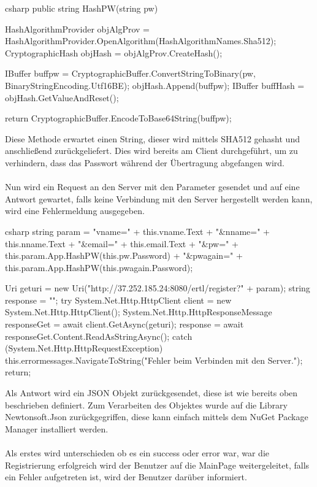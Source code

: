\begin{code}{csharp}
	public string HashPW(string pw)
	{
		HashAlgorithmProvider objAlgProv = HashAlgorithmProvider.OpenAlgorithm(HashAlgorithmNames.Sha512);
		CryptographicHash objHash = objAlgProv.CreateHash();
		
		IBuffer buffpw = CryptographicBuffer.ConvertStringToBinary(pw, BinaryStringEncoding.Utf16BE);
		objHash.Append(buffpw);
		IBuffer buffHash = objHash.GetValueAndReset();
		
		return CryptographicBuffer.EncodeToBase64String(buffpw);
	}
\end{code}

Diese Methode erwartet einen String, dieser wird mittels SHA512 gehasht und anschließend zurückgeliefert. Dies wird bereits am Client durchgeführt, um zu verhindern, dass das Passwort während der Übertragung abgefangen wird.
\\\\
Nun wird ein Request an den Server mit den Parameter gesendet und auf eine Antwort gewartet, falls keine Verbindung mit den Server hergestellt werden kann, wird eine Fehlermeldung ausgegeben.

\begin{code}{csharp}
	string param = "vname=" + this.vname.Text + "&nname=" + this.nname.Text + "&email=" + this.email.Text + "&pw=" + this.param.App.HashPW(this.pw.Password) + "&pwagain=" + this.param.App.HashPW(this.pwagain.Password);
	
	Uri geturi = new Uri("http://37.252.185.24:8080/ertl/register?" + param);
	string response = "";
	try
	{
		System.Net.Http.HttpClient client = new System.Net.Http.HttpClient();
		System.Net.Http.HttpResponseMessage responseGet = await client.GetAsync(geturi);
		response = await responseGet.Content.ReadAsStringAsync();
	}
	catch (System.Net.Http.HttpRequestException)
	{
		this.errormessages.NavigateToString("Fehler beim Verbinden mit den Server.");
		return;
	}
\end{code}

Als Antwort wird ein JSON Objekt zurückgesendet, diese ist wie bereits oben beschrieben definiert. Zum Verarbeiten des Objektes wurde auf die Library Newtonsoft.Json zurückgegriffen, diese kann einfach mittels dem NuGet Package Manager installiert werden.
\\\\
Als erstes wird unterschieden ob es ein success oder error war, war die Registrierung erfolgreich wird der Benutzer auf die MainPage weitergeleitet, falls ein Fehler aufgetreten ist, wird der Benutzer darüber informiert.

